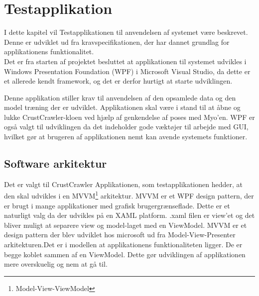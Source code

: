 \thispagestyle{fancy}
\chapter{Testapplikation}
I dette kapitel vil Testapplikationen til anvendelsen af systemet være beskrevet. Denne er udviklet ud fra kravspecifikationen, der har dannet grundlag for applikationens funktionalitet.\\
Det er fra starten af projektet besluttet at applikationen til systemet udvikles i Windows Presentation Foundation (WPF) i Microsoft Visual Studio, da dette er et allerede kendt framework, og det er derfor hurtigt at starte udviklingen.

Denne applikation stiller krav til anvendelsen af den opsamlede data og den model træning der er udviklet. Applikationen skal være i stand til at åbne og lukke CrustCrawler-kloen ved hjælp af genkendelse af poses med Myo'en. WPF er også valgt til udviklingen da det indeholder gode væktøjer til arbejde med GUI, hvilket gør at brugeren af applikationen nemt kan avende systemets funktioner.

\section{Software arkitektur}
Det er valgt til CrustCrawler Applikationen, som testapplikationen hedder, at den skal udvikles i en MVVM\footnote{Model-View-ViewModel} \cite{mvvm} arkitektur. MVVM er et WPF design pattern, der er brugt i mange applikationer med grafisk brugergrænseflade. Dette er et naturligt valg da der udvikles på en XAML platform. .xaml filen er view'et og det bliver muligt at separere view og model-laget med en ViewModel. MVVM er et design pattern der blev udviklet hos microsoft ud fra Model-View-Presenter arkitekturen.Det er i modellen at applikationens funktionaliteten ligger. De er begge koblet sammen af en ViewModel. Dette gør udviklingen af applikationen mere overskuelig og nem at gå til.


